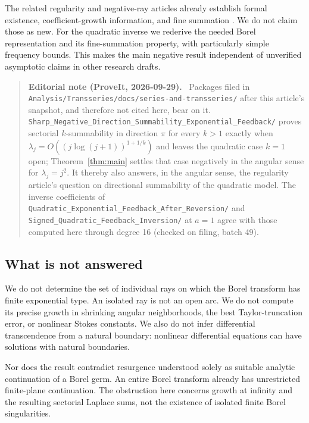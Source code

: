 \documentclass[11pt,a4paper]{article}
\numberwithin{equation}{section}
\theoremstyle{definition}
\theoremstyle{remark}
\newenvironment{ednote}{\par\smallskip\begin{quote}\small\raggedright\textbf{Editorial note (ProveIt, 2026-09-29).}\ }{\end{quote}\smallskip}
\begin{document}
The related regularity and negative-ray articles already establish formal
existence, coefficient-growth information, and fine summation
\cite{repo-regularity,repo-negative}.  We do not claim those as new.
For the quadratic inverse we rederive the needed Borel representation and
its fine-summation property, with particularly simple frequency bounds.
This makes the main negative result independent of unverified asymptotic
claims in other research drafts.
\begin{ednote}
Packages filed in
\nolinkurl{Analysis/Transseries/docs/series-and-transseries/} after this
article's snapshot, and therefore not cited here, bear on it.
\nolinkurl{Sharp_Negative_Direction_Summability_Exponential_Feedback/}
proves sectorial $k$-summability in direction $\pi$ for every $k>1$ exactly
when $\lambda_j=O((j\log(j+1))^{1+1/k})$ and leaves the quadratic case
$k=1$ open; Theorem~\ref{thm:main} settles that case negatively in the
angular sense for $\lambda_j=j^2$. It thereby also answers, in the angular
sense, the regularity article's question on directional summability of the
quadratic model. The inverse coefficients of
\nolinkurl{Quadratic_Exponential_Feedback_After_Reversion/} and
\nolinkurl{Signed_Quadratic_Feedback_Inversion/} at $a=1$ agree with those
computed here through degree 16 (checked on filing, batch 49).
\end{ednote}

\subsection{What is not answered}
We do not determine the set of individual rays on which the Borel transform
has finite exponential type.  An isolated ray is not an open arc.  We do
not compute its precise growth in shrinking angular neighborhoods, the
best Taylor-truncation error, or nonlinear Stokes constants.  We also do
not infer differential transcendence from a natural boundary: nonlinear
differential equations can have solutions with natural boundaries.

Nor does the result contradict resurgence understood solely as suitable
analytic continuation of a Borel germ.  An entire Borel transform already
has unrestricted finite-plane continuation.  The obstruction here concerns
growth at infinity and the resulting sectorial Laplace sums, not the
existence of isolated finite Borel singularities.
\end{document}
